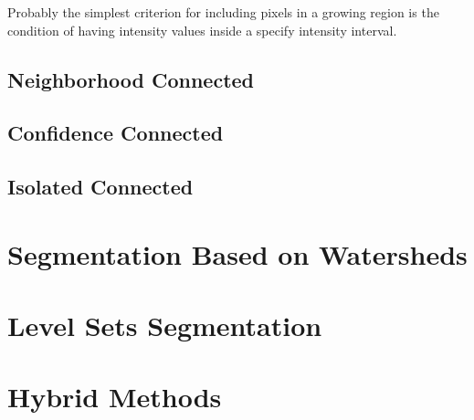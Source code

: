 Probably the simplest criterion for including pixels in a growing region is the
condition of  having intensity values inside a specify intensity interval.

\label{sec:ConnectedThreshold}
\ifitkFullVersion 

\fi


\subsection{Neighborhood Connected}
\label{sec:NeighborhoodConnectedImageFilter}
\ifitkFullVersion 

\fi



\subsection{Confidence Connected}
\label{sec:ConfidenceConnected}
\ifitkFullVersion 

\fi


\subsection{Isolated Connected}
\label{sec:IsolatedConnected}
\ifitkFullVersion 

\fi


\section{Segmentation Based on Watersheds}
\label{sec:WatershedSegmentation}
\ifitkFullVersion 

\fi


\section{Level Sets Segmentation}
\label{sec:LevelSetsSegmentation}
\ifitkFullVersion 

\fi


\section{Hybrid Methods} 
\label{sec:HybridSegmentationMethods}

\ifitkFullVersion 

\fi


